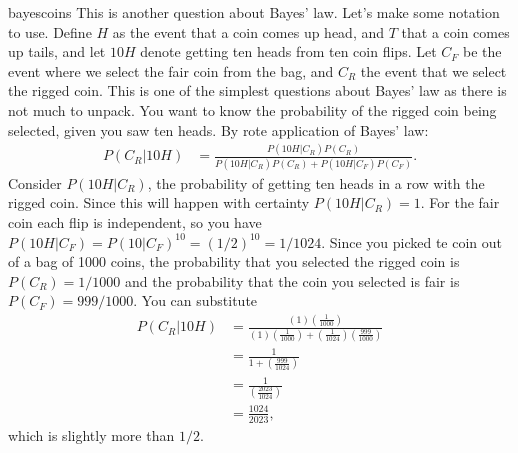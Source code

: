 \begin{answer}{bayescoins}
This is another question about Bayes' law.
Let's make some notation to use.
Define $H$ as the event that a coin comes up head, and $T$ that a coin comes up tails, and let $10H$ denote getting ten heads from ten coin flips.
Let $C_{F}$ be the event where we select the fair coin from the bag, and $C_{R}$ the event that we select the rigged coin.
This is one of the simplest questions about Bayes' law as there is not much to unpack.
You want to know the probability of the rigged coin being selected, given you saw ten heads.
By rote application of Bayes' law:
\begin{align}
\label{eq:1000coins:bayeslaw1}
 P( C_{R} \vert 10H)
 &=
 \frac{
    P( 10H \vert C_{R} )
    P( C_{R} )
 }{
    P( 10H \vert C_{R} )
    P( C_{R} )
    +
    P( 10H \vert C_{F} )
    P( C_{F} )
 }
 \text{.}
\end{align}
Consider
$P( 10H \vert C_{R} )$, the probability of getting ten heads in a row with the rigged coin.
Since this will happen with certainty
$P( 10H \vert C_{R} ) = 1$.
For the fair coin each flip is independent, so you have
$P( 10H \vert C_{F} )=P( 10 \vert C_{F} )^{10}= ({1}/{2})^{10} = {1}/{1024}$.
Since you picked te coin out of a bag of 1000 coins, the probability that you selected the rigged coin is
$P(C_{R}) = 1/1000$ and the probability that the coin you selected is fair is
$P(C_{F}) = 999/1000$.
You can substitute
\begin{align*}
 P( C_{R} \vert 10H)
 &=
 \frac{
    (1)
   \left( \frac{1}{1000} \right)
 }{
    (1)
   \left( \frac{1}{1000} \right)
    +
    \left(\frac{1}{1024}\right)
    \left(\frac{999}{1000}\right)
 }
 \\
 &=
 \frac{
    1
 }{
    1
    +
    \left(\frac{999}{1024}\right)
 }
 \\
 &=
 \frac{
    1
 }{
    \left(\frac{2023}{1024}\right)
 }
 \\
 &=
    \frac{1024}{2023}
 \text{,}
\end{align*}
which is slightly more than $1/2$.


\end{answer}
